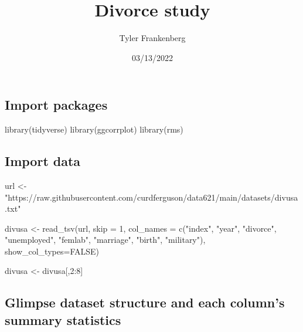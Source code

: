 \documentclass[
]{article}
\title{Divorce study}
\author{Tyler Frankenberg}
\date{03/13/2022}
\newenvironment{Shaded}{\begin{snugshade}}{\end{snugshade}}
\newcommand{\AttributeTok}[1]{\textcolor[rgb]{0.77,0.63,0.00}{#1}}
\newcommand{\ConstantTok}[1]{\textcolor[rgb]{0.00,0.00,0.00}{#1}}
\newcommand{\DecValTok}[1]{\textcolor[rgb]{0.00,0.00,0.81}{#1}}
\newcommand{\FunctionTok}[1]{\textcolor[rgb]{0.00,0.00,0.00}{#1}}
\newcommand{\NormalTok}[1]{#1}
\newcommand{\OtherTok}[1]{\textcolor[rgb]{0.56,0.35,0.01}{#1}}
\newcommand{\SpecialCharTok}[1]{\textcolor[rgb]{0.00,0.00,0.00}{#1}}
\newcommand{\StringTok}[1]{\textcolor[rgb]{0.31,0.60,0.02}{#1}}
\begin{document}
\maketitle

\hypertarget{import-packages}{%
\subsection{Import packages}\label{import-packages}}

\begin{Shaded}
\begin{Highlighting}[]
\FunctionTok{library}\NormalTok{(tidyverse)}
\FunctionTok{library}\NormalTok{(ggcorrplot)}
\FunctionTok{library}\NormalTok{(rms)}
\end{Highlighting}
\end{Shaded}

\hypertarget{import-data}{%
\subsection{Import data}\label{import-data}}

\begin{Shaded}
\begin{Highlighting}[]
\NormalTok{url }\OtherTok{\textless{}{-}} \StringTok{"https://raw.githubusercontent.com/curdferguson/data621/main/datasets/divusa.txt"}

\NormalTok{divusa }\OtherTok{\textless{}{-}} \FunctionTok{read\_tsv}\NormalTok{(url, }\AttributeTok{skip =} \DecValTok{1}\NormalTok{, }\AttributeTok{col\_names =} \FunctionTok{c}\NormalTok{(}\StringTok{"index"}\NormalTok{, }\StringTok{"year"}\NormalTok{, }\StringTok{"divorce"}\NormalTok{, }\StringTok{"unemployed"}\NormalTok{, }\StringTok{"femlab"}\NormalTok{, }\StringTok{"marriage"}\NormalTok{, }\StringTok{"birth"}\NormalTok{, }\StringTok{"military"}\NormalTok{), }\AttributeTok{show\_col\_types=}\ConstantTok{FALSE}\NormalTok{)}

\NormalTok{divusa }\OtherTok{\textless{}{-}}\NormalTok{ divusa[,}\DecValTok{2}\SpecialCharTok{:}\DecValTok{8}\NormalTok{]}
\end{Highlighting}
\end{Shaded}

\hypertarget{glimpse-dataset-structure-and-each-columns-summary-statistics}{%
\subsection{Glimpse dataset structure and each column's summary
statistics}\label{glimpse-dataset-structure-and-each-columns-summary-statistics}}
\end{document}
